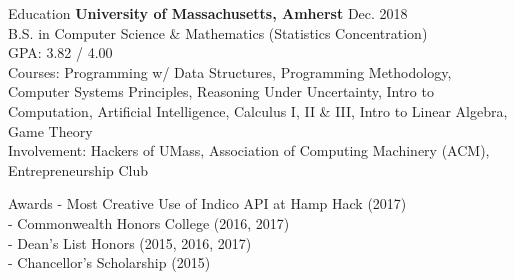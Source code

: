 \documentclass{resume} %
\begin{document}
	
	
	\begin{rSection}{Education}
		{\bf University of Massachusetts, Amherst} \hfill {Dec. 2018} \\ 
		B.S. in Computer Science \& Mathematics (Statistics Concentration) \\
		GPA: 3.82 / 4.00 \smallskip \\
		Courses: Programming w/ Data Structures, Programming Methodology, Computer Systems Principles, Reasoning Under Uncertainty, Intro to Computation, Artificial Intelligence, Calculus I, II \& III, Intro to Linear Algebra, Game Theory  \\
		Involvement: Hackers of UMass, Association of Computing Machinery (ACM), Entrepreneurship Club \\
	\end{rSection}
	
	
	\begin{rSection}{Awards}
		- Most Creative Use of Indico API at Hamp Hack (2017) \\
		- Commonwealth Honors College (2016, 2017) \\
		- Dean's List Honors (2015, 2016, 2017) \\
		- Chancellor's Scholarship (2015)
	\end{rSection}
	
	
\end{document}
